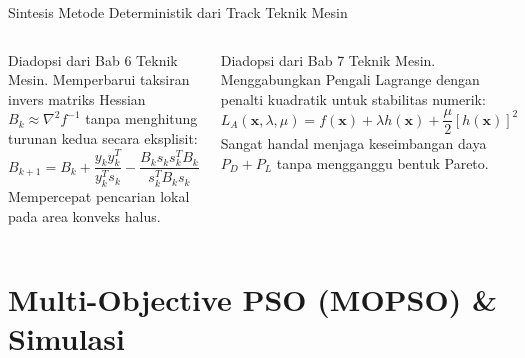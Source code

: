 \documentclass[10pt,aspectratio=169]{beamer}
\begin{document}
\begin{frame}{Sintesis Metode Deterministik dari Track Teknik Mesin}
    \begin{columns}
        \begin{tcolorbox}[colback=white,colframe=unibblue,title=\textbf{1. Quasi-Newton BFGS}]
            Diadopsi dari Bab 6 Teknik Mesin. Memperbarui taksiran invers matriks Hessian $B_k \approx \nabla^2 f^{-1}$ tanpa menghitung turunan kedua secara eksplisit:
            \[
                B_{k+1} = B_k + \frac{y_k y_k^T}{y_k^T s_k} - \frac{B_k s_k s_k^T B_k}{s_k^T B_k s_k}
            \]
            Mempercepat pencarian lokal pada area konveks halus.
        \end{tcolorbox}

        \begin{tcolorbox}[colback=white,colframe=darkgreen,title=\textbf{2. Augmented Lagrangian Method}]
            Diadopsi dari Bab 7 Teknik Mesin. Menggabungkan Pengali Lagrange dengan penalti kuadratik untuk stabilitas numerik:
            \[
                L_A(\mathbf{x}, \lambda, \mu) = f(\mathbf{x}) + \lambda h(\mathbf{x}) + \frac{\mu}{2} [h(\mathbf{x})]^2
            \]
            Sangat handal menjaga keseimbangan daya $P_D + P_L$ tanpa mengganggu bentuk Pareto.
        \end{tcolorbox}
    \end{columns}
\end{frame}

\section{Multi-Objective PSO (MOPSO) & Simulasi}
\end{document}
